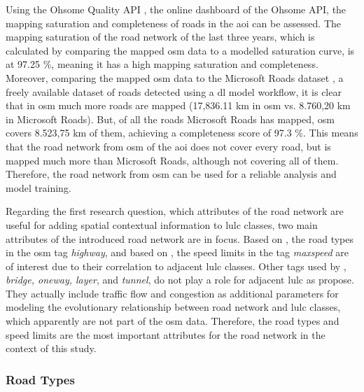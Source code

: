 Using the Ohsome Quality API \autocite{HeiGIT2024c}, the online dashboard of the Ohsome API, the mapping saturation and completeness of roads in the \gls{aoi} can be assessed. The mapping saturation of the road network of the last three years, which is calculated by comparing the mapped \gls{osm} data to a modelled saturation curve, is at 97.25 \%, meaning it has a high mapping saturation and completeness. Moreover, comparing the mapped \gls{osm} data to the Microsoft Roads dataset \autocite{Microsoft2024}, a freely available dataset of roads detected using a \gls{dl} model workflow, it is clear that in \gls{osm} much more roads are mapped (17,836.11 km in \gls{osm} vs. 8.760,20 km in Microsoft Roads). But, of all the roads Microsoft Roads has mapped, \gls{osm} covers 8.523,75 km of them, achieving a completeness score of 97.3 \%. This means that the road network from \gls{osm} of the \gls{aoi} does not cover every road, but is mapped much more than Microsoft Roads, although not covering all of them. Therefore, the road network from \gls{osm} can be used for a reliable analysis and model training.

Regarding the first research question, which attributes of the road network are useful for adding spatial contextual information to \gls{lulc} classes, two main attributes of the introduced road network are in focus. Based on \textcite{Ahmadzai2020,Forget.Linard.ea2018}, the road types in the \gls{osm} tag \emph{highway}, and based on \textcite{Levinson.Xie.ea2007,Levinson.Yerra2005,Zhao.Ning.ea2023}, the speed limits in the tag \emph{maxspeed} are of interest due to their correlation to adjacent \gls{lulc} classes. Other tags used by \textcite{Zhao.Ning.ea2023}, \emph{bridge, oneway, layer}, and \emph{tunnel}, do not play a role for adjacent \gls{lulc} as \textcite{Levinson.Xie.ea2007,Levinson.Yerra2005} propose. They actually include traffic flow and congestion as additional parameters for modeling the evolutionary relationship between road network and \gls{lulc} classes, which apparently are not part of the \gls{osm} data. Therefore, the road types and speed limits are the most important attributes for the road network in the context of this study.

\subsubsection*{Road Types}

